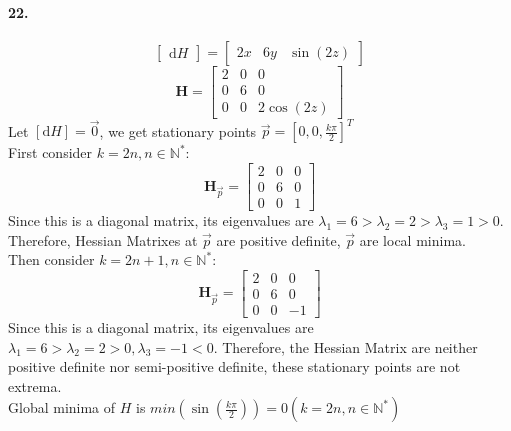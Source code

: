 \documentclass[11pt, a4paper]{article}
\begin{document}
\paragraph{22.}
$$\begin{bmatrix}
        \mathrm{d}H
\end{bmatrix} =
\begin{bmatrix}
        2x & 6y & \sin(2z)
\end{bmatrix}$$
$$\bm{H} = 
\begin{bmatrix}
    2 & 0 & 0 \\
    0 & 6 & 0 \\
    0 & 0 & 2\cos(2z)   
\end{bmatrix}$$
Let $[\mathrm{d}H] = \vec{0}$, we get stationary points $\vec{p} = [0, 0, \frac{k\pi}{2}]^T$ \\
First consider $k = 2n, n \in \mathbb{N}^*$:
$$\bm{H}_{\vec{p}} = 
\begin{bmatrix}
    2 & 0 & 0 \\
    0 & 6 & 0 \\
    0 & 0 & 1
\end{bmatrix}$$
Since this is a diagonal matrix, its eigenvalues are $\lambda_1 = 6> \lambda_2 = 2 > \lambda_3 = 1> 0$.
Therefore, Hessian Matrixes at $\vec{p}$ are positive definite, $\vec{p}$ are local minima. \\
Then consider $k = 2n + 1, n \in \mathbb{N}^*$:
$$\bm{H}_{\vec{p}} = 
\begin{bmatrix}
    2 & 0 & 0 \\
    0 & 6 & 0 \\
    0 & 0 & -1
\end{bmatrix}$$
Since this is a diagonal matrix, its eigenvalues are $\lambda_1 = 6> \lambda_2 = 2 > 0, \lambda_3 = -1 < 0$. Therefore, the Hessian Matrix are neither positive definite nor semi-positive definite, these stationary points are not extrema. \\
Global minima of $H$ is $min(\sin(\frac{k\pi}{2})) = 0 (k = 2n, n \in \mathbb{N}^*)$
\end{document}
